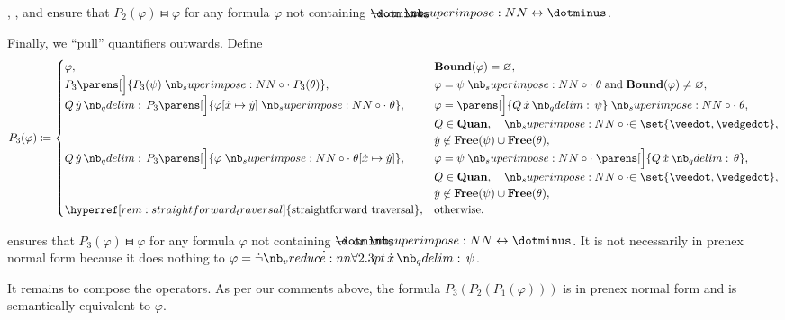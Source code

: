 \begin{algorithm}
\begin{thmenum}
    , ,  and  ensure that \( P_2(\varphi) \gleichstark \varphi \) for any formula \( \varphi \)  not containing \( \synimplies \) or \( \syniff \).

     Finally, we \enquote{pull} quantifiers outwards. Define
    \begin{equation*}
      P_3(\varphi) \coloneqq \begin{cases}
        \varphi,                                                                           &\op*{Bound}(\varphi) = \varnothing, \\
        P_3\parens[\Big]{ P_3(\psi) \syncirc P_3(\theta) },                                &\varphi = \psi \syncirc \theta \T{and} \op*{Bound}(\varphi) \neq \varnothing, \\
        \quantifier Q \syny P_3 \parens[\Big]{ \varphi[\synx \mapsto \syny] \syncirc \theta }, &\varphi = \parens[\Big]{ \quantifier Q \synx \psi } \syncirc \theta, \\
                                                                                           &Q \in \op*{Quan}, \quad \syncirc \in \set{ \synvee, \synwedge }, \\
                                                                                           &\syny \not\in \op*{Free}(\psi) \cup \op*{Free}(\theta), \\
        \quantifier Q \syny P_3 \parens[\Big]{ \varphi \syncirc \theta[\synx \mapsto \syny] }, &\varphi = \psi \syncirc \parens[\Big]{ \quantifier Q \synx \theta }, \\
                                                                                           &Q \in \op*{Quan}, \quad \syncirc \in \set{ \synvee, \synwedge }, \\
                                                                                           &\syny \not\in \op*{Free}(\psi) \cup \op*{Free}(\theta), \\
        \hyperref[rem:straightforward_traversal]{\T{straightforward traversal}},           &\T{otherwise.}
      \end{cases}
    \end{equation*}

     ensures that \( P_3(\varphi) \gleichstark \varphi \) for any formula \( \varphi \) not containing \( \synimplies \) or \( \syniff \). It is not necessarily in prenex normal form because it does nothing to \( \varphi = \synneg \qforall \synx \psi \).
  \end{thmenum}

  It remains to compose the operators. As per our comments above, the formula \( P_3(P_2(P_1(\varphi))) \) is in prenex normal form and is semantically equivalent to \( \varphi \).
\end{algorithm}
